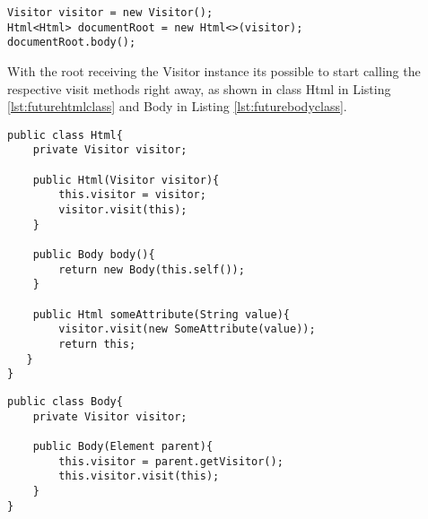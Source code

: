 \bigskip


\begin{minipage}{\linewidth}
\begin{lstlisting}[caption={Future Solution Usage 1}, label={lst:futuresolutionusage}]
Visitor visitor = new Visitor();
Html<Html> documentRoot = new Html<>(visitor);
documentRoot.body();
\end{lstlisting}
\end{minipage}

\noindent
With the root receiving the Visitor instance its possible to start calling the respective visit methods right away, as shown in class Html in Listing \ref{lst:futurehtmlclass} and Body in Listing \ref{lst:futurebodyclass}.

\bigskip


\begin{minipage}{\linewidth}
\begin{lstlisting}[caption={Future Solution Html Class (Simplified)}, label={lst:futurehtmlclass}]
public class Html{
    private Visitor visitor;
	
    public Html(Visitor visitor){
        this.visitor = visitor;
        visitor.visit(this);
    }
	
    public Body body(){
        return new Body(this.self());
    }
    
    public Html someAttribute(String value){
        visitor.visit(new SomeAttribute(value));
        return this;
   }
}
\end{lstlisting}
\end{minipage}

\newpage


\begin{minipage}{\linewidth}
\begin{lstlisting}[caption={Future Solution Body Class (Simplified)}, label={lst:futurebodyclass}]
public class Body{
    private Visitor visitor;

    public Body(Element parent){
        this.visitor = parent.getVisitor();
        this.visitor.visit(this);
    }	
}
\end{lstlisting}
\end{minipage}

